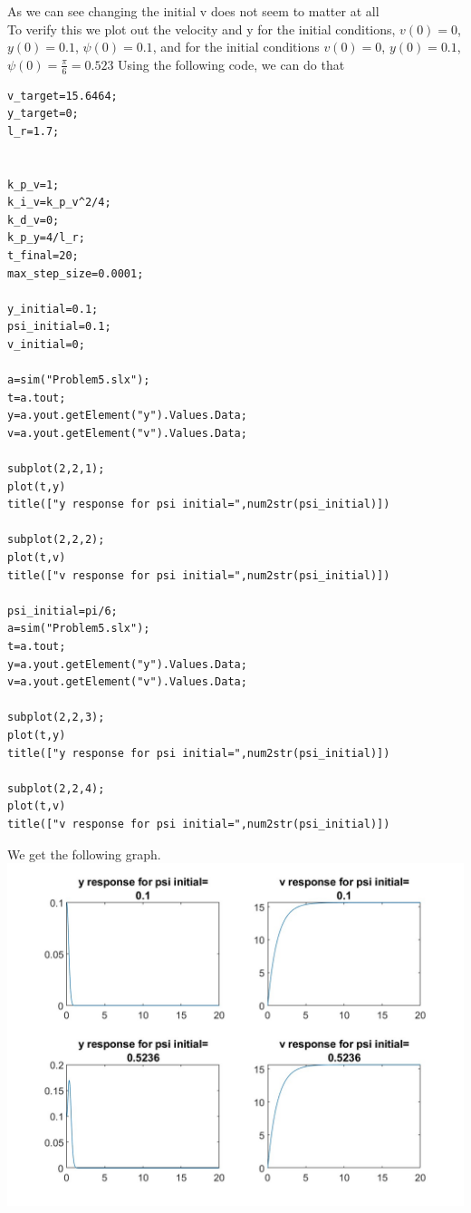 \documentclass[12pt]{article}
\begin{document}
As we can see changing the initial v does not seem to matter at all\\
To verify this we plot out the velocity and y for the initial conditions, $v(0)=0$, $y(0)=0.1$, $\psi(0)=0.1$,
 and for the initial conditions $v(0)=0$, $y(0)=0.1$, $\psi(0)=\frac{\pi}{6}=0.523$
Using the following code, we can do that
\begin{verbatim}
v_target=15.6464;
y_target=0;
l_r=1.7;


k_p_v=1;
k_i_v=k_p_v^2/4;
k_d_v=0;
k_p_y=4/l_r;
t_final=20;
max_step_size=0.0001;

y_initial=0.1;
psi_initial=0.1;
v_initial=0;

a=sim("Problem5.slx");
t=a.tout;
y=a.yout.getElement("y").Values.Data;
v=a.yout.getElement("v").Values.Data;

subplot(2,2,1); 
plot(t,y)
title(["y response for psi initial=",num2str(psi_initial)])

subplot(2,2,2); 
plot(t,v)
title(["v response for psi initial=",num2str(psi_initial)])

psi_initial=pi/6;
a=sim("Problem5.slx");
t=a.tout;
y=a.yout.getElement("y").Values.Data;
v=a.yout.getElement("v").Values.Data;

subplot(2,2,3); 
plot(t,y)
title(["y response for psi initial=",num2str(psi_initial)])

subplot(2,2,4); 
plot(t,v)
title(["v response for psi initial=",num2str(psi_initial)])
\end{verbatim}
We get the following graph.\\
\includegraphics[scale=0.3]{Problem5Fig3.jpg}\\
\end{document}
